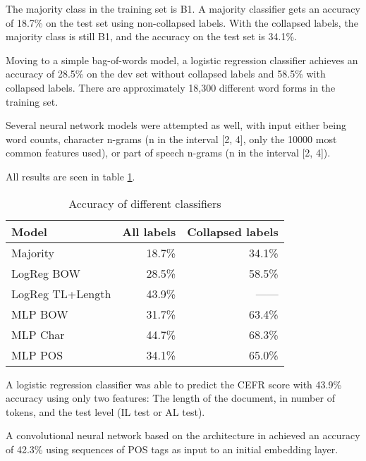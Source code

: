 The majority class in the training set is B1. A majority classifier gets an
accuracy of 18.7\% on the test set using non-collapsed labels. With the
collapsed labels, the majority class is still B1, and the accuracy on the
test set is 34.1\%.

Moving to a simple bag-of-words model, a logistic regression classifier
achieves an accuracy of 28.5\% on the dev set without collapsed labels and
58.5\% with collapsed labels. There are approximately 18,300 different word
forms in the training set.

Several neural network models were attempted as well, with input either being
word counts, character n-grams (n in the interval [2, 4], only the 10000 most
common features used), or part of speech n-grams (n in the interval [2, 4]).

All results are seen in table \ref{baseline-accuracies}.

\begin{table}
  \centering
  \begin{tabular}{lrr}
    \toprule
    Model            & All labels & Collapsed labels \\
    \midrule
    Majority         &     18.7\% &           34.1\% \\
    LogReg BOW       &     28.5\% &           58.5\% \\
    LogReg TL+Length &     43.9\% &           ------ \\
    MLP BOW          &     31.7\% &           63.4\% \\
    MLP Char         &     44.7\% &           68.3\% \\
    MLP POS          &     34.1\% &           65.0\% \\
    \bottomrule
  \end{tabular}
  \caption{Accuracy of different classifiers}
  \label{baseline-accuracies}
\end{table}

A logistic regression classifier was able to predict the CEFR score with
43.9\% accuracy using only two features: The length of the document, in
number of tokens, and the test level (IL test or AL test).

A convolutional neural network based on the architecture in
\textcite{zhang2017sensitivity} achieved an accuracy of 42.3\% using
sequences of POS tags as input to an initial embedding layer.
